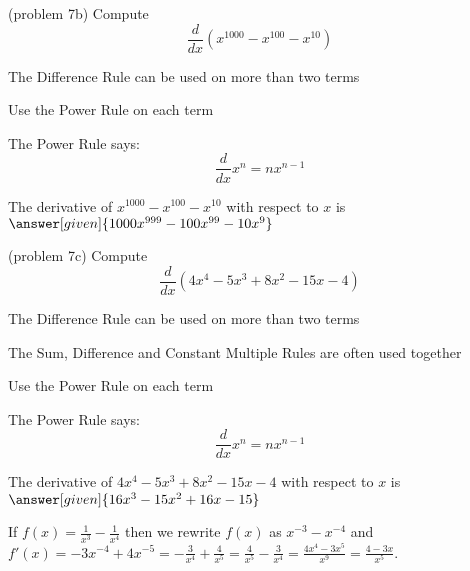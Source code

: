 \documentclass{ximera}
\begin{document}
\begin{problem}(problem 7b)
  Compute 
  \[
  \frac{d}{dx} \left(x^{1000} - x^{100} - x^{10}\right)
  \]
  
    \begin{hint}
		  The Difference Rule can be used on more than two terms
		\end{hint}
		\begin{hint}
      Use the Power Rule on each term
    \end{hint}
    \begin{hint}
      The Power Rule says:
      \[
      \frac{d}{dx} x^n = nx^{n-1}
      \]
    \end{hint}    
		The derivative of $x^{1000} - x^{100} - x^{10}$ with respect to $x$ is
		 $\answer[given]{1000x^{999} - 100x^{99} - 10x^9}$
	
\end{problem}


\begin{problem}(problem 7c) %
  Compute 
  \[
  \frac{d}{dx} \left(4x^4 - 5x^3 + 8x^2 - 15x - 4\right)
  \]
  
    \begin{hint}
		  The Difference Rule can be used on more than two terms
		\end{hint}
		\begin{hint}
		  The Sum, Difference and Constant Multiple Rules are often used together 
		\end{hint}
		\begin{hint}
      Use the Power Rule on each term
    \end{hint}
    \begin{hint}
      The Power Rule says:
      \[
      \frac{d}{dx} x^n = nx^{n-1}
      \]
    \end{hint}    
		The derivative of $4x^4 - 5x^3 + 8x^2 - 15x - 4$ with respect to $x$ is
		 $\answer[given]{16x^3 - 15x^2 + 16x - 15}$
	
\end{problem}


\begin{example}[example 8]
 If $f(x) = \frac{1}{x^3} - \frac{1}{x^4}$ then we rewrite $f(x)$ as $x^{-3} - x^{-4}$ and 
$f'(x) = -3x^{-4} + 4x^{-5} = -\frac{3}{x^4} + \frac{4}{x^5} = \frac{4}{x^5}-\frac{3}{x^4} = 
\frac{4x^4 - 3x^5}{x^9} = \frac{4 - 3x}{x^5}$.
\end{example}
\end{document}

